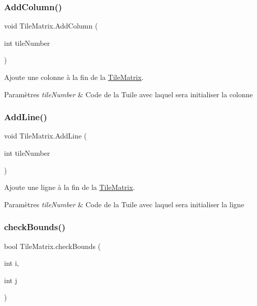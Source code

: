 \subsubsection{\texorpdfstring{Add\+Column()}{AddColumn()}}
{\footnotesize\ttfamily void Tile\+Matrix.\+Add\+Column (\begin{DoxyParamCaption}\item[{int}]{tile\+Number }\end{DoxyParamCaption})}



Ajoute une colonne à la fin de la \hyperlink{class_tile_matrix}{Tile\+Matrix}. 


\begin{DoxyParams}{Paramètres}
{\em tile\+Number} & Code de la Tuile avec laquel sera initialiser la colonne \\
\hline
\end{DoxyParams}
\mbox{\label{class_tile_matrix_aa54a37298476381854db5a561de3fbc0}} 
\subsubsection{\texorpdfstring{Add\+Line()}{AddLine()}}
{\footnotesize\ttfamily void Tile\+Matrix.\+Add\+Line (\begin{DoxyParamCaption}\item[{int}]{tile\+Number }\end{DoxyParamCaption})}



Ajoute une ligne à la fin de la \hyperlink{class_tile_matrix}{Tile\+Matrix}. 


\begin{DoxyParams}{Paramètres}
{\em tile\+Number} & Code de la Tuile avec laquel sera initialiser la ligne \\
\hline
\end{DoxyParams}
\mbox{\label{class_tile_matrix_a0f2e1f3c6eda5d5c60a48ccf3ab26c3b}} 
\subsubsection{\texorpdfstring{check\+Bounds()}{checkBounds()}}
{\footnotesize\ttfamily bool Tile\+Matrix.\+check\+Bounds (\begin{DoxyParamCaption}\item[{int}]{i,  }\item[{int}]{j }\end{DoxyParamCaption})}



